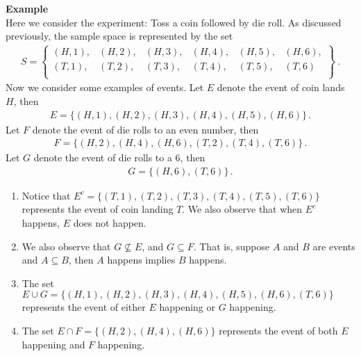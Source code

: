 \documentclass[11pt,oneside]{book}
\theoremstyle{newStyle}
\begin{document}
\vspace{2cm}

\textbf{Example}\\
Here we consider the experiment: Toss a coin followed by die roll. As discussed previously, the sample space is represented by the set
\begin{align*}
S = \left\{
\begin{matrix}
(H,1), &(H,2), &(H,3),& (H,4),& (H,5),& (H,6), \\
(T,1),& (T,2), &(T,3), &(T,4),& (T,5), &(T,6) \\
\end{matrix}
\right\}\ .
\end{align*}
Now we consider some examples of events. Let $E$ denote the event of coin lands $H$, then
\begin{align*}
E = \{(H,1), (H,2), (H,3), (H,4), (H,5), (H,6) \}\,.
\end{align*}
Let $F$ denote the event of die rolls to an even number, then
\begin{align*}
F = \{(H,2), (H,4), (H,6), (T,2), (T,4), (T,6)\}\,.
\end{align*}
Let $G$ denote the event of die rolls to a 6, then
\begin{align*}
G = \{(H,6), (T,6)\}\,. 
\end{align*}
\begin{enumerate}
\item Notice that 
$E^c = \{(T,1), (T,2), (T,3), (T,4), (T,5), (T,6)\}$
represents the event of coin landing $T$. We also observe that when $E^c$ happens, $E$ does not happen. 
\item We also observe that $G \nsubseteq E$, and $G \subseteq F$. That is, suppose $A$ and $B$ are events and $A \subseteq B$, then $A$ happens implies $B$ happens. 
\item The set $E \cup G = \{(H,1), (H,2), (H,3), (H,4), (H,5), (H,6), (T,6)\}$ represents the event of either $E$ happening or $G$ happening.  
\item The set $E \cap F = \{(H,2), (H,4), (H,6)\}$ represents the event of both $E$ happening and $F$ happening.  
\end{enumerate}
\end{document}
